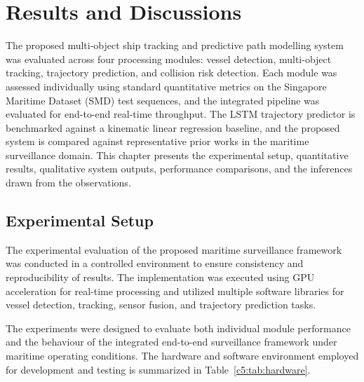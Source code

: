 
\chapter{Results and Discussions}

The proposed multi-object ship tracking and predictive path modelling system 
was evaluated across four processing modules: vessel detection, multi-object 
tracking, trajectory prediction, and collision risk detection. Each module was 
assessed individually using standard quantitative metrics on the Singapore 
Maritime Dataset (SMD) test sequences, and the integrated pipeline was 
evaluated for end-to-end real-time throughput. The LSTM trajectory predictor 
is benchmarked against a kinematic linear regression baseline, and the 
proposed system is compared against representative prior works in the 
maritime surveillance domain. This chapter presents the experimental setup, 
quantitative results, qualitative system outputs, performance comparisons, 
and the inferences drawn from the observations.

\section{Experimental Setup}

The experimental evaluation of the proposed maritime surveillance framework was conducted in a controlled environment to ensure consistency and reproducibility of results. The implementation was executed using GPU acceleration for real-time processing and utilized multiple software libraries for vessel detection, tracking, sensor fusion, and trajectory prediction tasks.

The experiments were designed to evaluate both individual module performance and the behaviour of the integrated end-to-end surveillance framework under maritime operating conditions. The hardware and software environment employed for development and testing is summarized in Table~\ref{c5:tab:hardware}.

